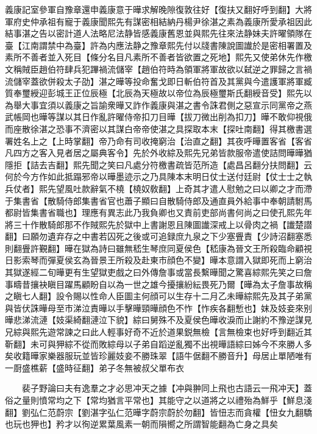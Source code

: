 義康記室參軍自豫章還申義康意于曄求解晚隙復敦往好【復扶又翻好呼到翻】大將軍府史仲承祖有寵于義康聞熙先有謀密相結納丹楊尹徐湛之素為義康所愛承祖因此結事湛之告以密計道人法略尼法静皆感義康舊恩並與熙先往來法静妹夫許曜領隊在臺【江南謂禁中為臺】許為内應法静之豫章熙先付以牋書陳說圖䜟於是密相署置及素所不善者並入死目【條分名目凡素所不善者皆欲置之死地】熙先又使弟休先作檄文稱賊臣趙伯符肆兵犯蹕禍流儲宰【趙伯符時為領軍將軍故欲以弑逆之罪歸之言禍流儲宰蓋欲併殺太子劭】湛之曄等投命奮戈即日斬伯符首及其黨與今遣護軍將軍臧質奉璽綬迎彭城王正位辰極【北辰為天極故以帝位為辰極璽斯氏翻綬音受】熙先以為舉大事宜須以義康之旨諭衆曄又詐作義康與湛之書令誅君側之惡宣示同黨帝之燕武帳岡也曄等謀以其日作亂許曜侍帝扣刀目曄【拔刀微出削為扣刀】曄不敢仰視俄而座散徐湛之恐事不濟密以其謀白帝帝使湛之具探取本末【探吐南翻】得其檄書選署姓名上之【上時掌翻】帝乃命有司收掩窮治【治直之翻】其夜呼曄置客省【客省凡四方之客入見者居之屬典客令】先於外收綜及熙先兄弟皆款服帝遣使詰問曄曄猶隱拒【詰去吉翻】熙先聞之笑曰凡處分符檄書疏皆范所造【處昌呂翻分扶問翻】云何於今方作如此抵蹋邪帝以曄墨迹示之乃具陳本末明日仗士送付廷尉【仗士士之執兵仗者】熙先望風吐款辭氣不橈【橈奴敎翻】上奇其才遣人慰勉之曰以卿之才而滯于集書省【散騎侍郎集書省官也蕭子顯曰自散騎侍郎及通直員外給事中奉朝請駙馬都尉皆集書省職也】理應有異志此乃我負卿也又責前吏部尚書何尚之曰使孔熙先年將三十作散騎郎那不作賊熙先於獄中上書謝恩且陳圖䜟深戒上以骨肉之禍【䜟楚譛翻】曰願勿遺弃存之中書若囚死之後或可追録庶九泉之下少塞舋責【少詩沼翻塞悉則翻舋許覲翻】曄在獄為詩曰雖無嵇生琴庶同夏侯色【嵇康為晉文王所殺臨命顧視日影索琴而彈夏侯玄為晉景王所殺及赴東市顔色不變】曄本意謂入獄即死而上窮治其獄遂經二旬曄更有生望獄吏戲之曰外傳詹事或當長繫曄聞之驚喜綜熙先笑之曰詹事疇昔攘袂瞋目躍馬顧盼自以為一世之雄今擾攘紛紜畏死乃爾【曄為太子詹事故稱之瞋七人翻】設令賜以性命人臣圖主何顔可以生存十二月乙未曄綜熙先及其子弟黨與皆伏誅曄母至市涕泣責曄以手擊曄頸曄顔色不怍【怍疾各翻慙也】妺及妓妾來别曄悲涕流漣【妓渠綺翻漣泣下貌】綜曰舅殊不及夏侯色曄收淚而止謝約不豫逆謀見兄綜與熙先遊常諫之曰此人輕事好奇不近於道果鋭無檢【言無檢束也好呼到翻近其靳翻】未可與狎綜不從而敗綜母以子弟自蹈逆亂獨不出視曄語綜曰姊今不來勝人多矣收籍曄家樂器服玩並皆珍麗妓妾不勝珠翠【語牛倨翻不勝音升】母居止單陋唯有一㕑盛樵薪【盛時征翻】弟子冬無被叔父單布衣

　　裴子野論曰夫有逸羣之才必思冲天之據【冲與翀同上飛也古語云一飛冲天】蓋俗之量則憤常均之下【常均猶言平常也】其能守之以道將之以禮殆為鮮乎【鮮息淺翻】劉弘仁范蔚宗【劉湛字弘仁范曄字蔚宗蔚於勿翻】皆忸志而貪權【忸女九翻驕也玩也狎也】矜才以徇逆累葉風素一朝而隕嚮之所謂智能翻為亡身之具矣

